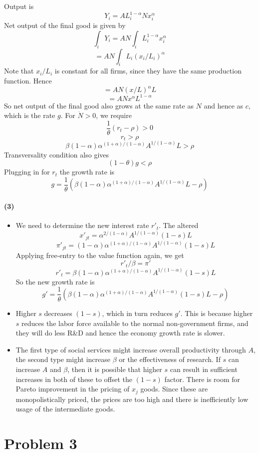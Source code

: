 \documentclass[10pt,letter]{article}
\newcommand{\problem}[1]{\section*{Problem #1}}
\newcommand{\problempart}[1]{\paragraph{#1}}
\begin{document}
Output is
\[ Y_i = AL_i^{1-\alpha} N x_i^\alpha \]
Net output of the final good is given by
\[ \int_i Y_i = AN \int_i L_i^{1-\alpha} x_i^\alpha \]
\[ = AN \int_i L_i (x_i/L_i)^\alpha \]
Note that $x_i/L_i$ is constant for all firms, since they have the same production function. Hence
\[ = AN \left(x/L\right)^\alpha L \]
\[ = AN x^\alpha L^{1-\alpha} \]
So net output of the final good also grows at the same rate as $N$ and hence as $c$, which is the rate $g$. For $\dot{N} > 0$, we require
\[ \frac{1}{\theta}(r_t-\rho) > 0\]
\[ r_t > \rho \]
\[ \beta(1-\alpha)\alpha^{(1+\alpha)/(1-\alpha)}A^{1/(1-\alpha)}L  > \rho \]
Transversality condition also gives
\[ (1-\theta)g < \rho \]
Plugging in for $r_t$ the growth rate is
\[ g = \frac{1}{\theta}\left(\beta(1-\alpha)\alpha^{(1+\alpha)/(1-\alpha)}A^{1/(1-\alpha)}L-\rho\right) \]
\problempart{(3)}
\begin{itemize}
  \item We need to determine the new interest rate $r'_t$. The altered
  \[ x'_{jt} = \alpha^{2/(1-\alpha)}A^{1/(1-\alpha)}(1-s)L \]
  \[ \pi'_{jt} = (1-\alpha)\alpha^{(1+\alpha)/(1-\alpha)}A^{1/(1-\alpha)}(1-s)L \]
  Applying free-entry to the value function again, we get
  \[ r'_t/\beta = \pi'  \]
  \[ r'_t = \beta (1-\alpha)\alpha^{(1+\alpha)/(1-\alpha)}A^{1/(1-\alpha)}(1-s)L \]
  So the new growth rate is
  \[ g' = \frac{1}{\theta}\left(  \beta (1-\alpha)\alpha^{(1+\alpha)/(1-\alpha)}A^{1/(1-\alpha)}(1-s)L  - \rho \right) \]

  \item Higher $s$ decreases $(1-s)$, which in turn reduces $g'$. This is because higher $s$ reduces the labor force available to the normal non-government firms, and they will do less R\&D and hence the economy growth rate is slower.
  \item The first type of social services might increase overall productivity through $A$, the second type might increase $\beta$ or the effectiveness of research. If $s$ can increase $A$ and $\beta$, then it is possible that higher $s$ can result in sufficient increases in both of these to offset the $(1-s)$ factor. There is room for Pareto improvement in the pricing of $x_j$ goods. Since these are monopolistically priced, the prices are too high and there is inefficiently low usage of the intermediate goods.
\end{itemize}
\pagebreak
\problem{3}
\end{document}
